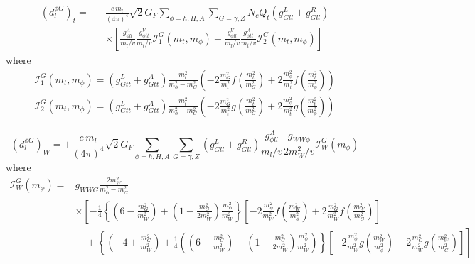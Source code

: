 \begin{align}\label{eq:BarrZee-phiG-toploop}
	(d^{\phi G}_{l})_{t} = -&\frac{e\,m_{l}}{(4\pi)^{4}}\sqrt{2}G_{F}\sum_{\phi=h,H,A}\sum_{G=\gamma,Z}N_{c}Q_{t}(g_{Gll}^{L}+g_{Gll}^{R}) \nonumber \\
	& \times \left[\frac{g_{\phi ll}^{A}}{m_{l}/v}\frac{g_{\phi tt}^{V}}{m_{t}/v}\mathcal{I}_{1}^{G}(m_{t}, m_{\phi}) + \frac{g_{\phi ll}^{V}}{m_{l}/v}\frac{g_{\phi tt}^{A}}{m_{t}/v}\mathcal{I}_{2}^{G}(m_{t}, m_{\phi})\right]
\end{align}
where
\begin{align}
	\mathcal{I}_{1}^{G}(m_{t},m_{\phi}) = (g_{Gtt}^{L}+g_{Gtt}^{A})\frac{m_{t}^{2}}{m_{\phi}^{2}-m_{G}^{2}}
	\left(-2\frac{m_{G}^{2}}{m_{t}^{2}} f\left(\frac{m_{t}^{2}}{m_{G}^{2}}\right) + 2\frac{m_{\phi}^{2}}{m_{t}^{2}} f\left(\frac{m_{t}^{2}}{m_{\phi}^{2}}\right)\right) \nonumber \\
	\mathcal{I}_{2}^{G}(m_{t},m_{\phi}) = (g_{Gtt}^{L}+g_{Gtt}^{A})\frac{m_{t}^{2}}{m_{\phi}^{2}-m_{G}^{2}}
	\left(-2\frac{m_{G}^{2}}{m_{t}^{2}} g\left(\frac{m_{t}^{2}}{m_{G}^{2}}\right) + 2\frac{m_{\phi}^{2}}{m_{t}^{2}} g\left(\frac{m_{t}^{2}}{m_{\phi}^{2}}\right)\right)
\end{align}

\begin{equation}\label{eq:BarrZee-phiG-Wloop}
	(d^{\phi G}_{l})_{W} = +\frac{e\,m_{l}}{(4\pi)^{4}}\sqrt{2}G_{F}\sum_{\phi=h,H,A}\sum_{G=\gamma,Z}(g_{Gll}^{L}+g_{Gll}^{R})\frac{g_{\phi ll}^{A}}{m_{l}/v}\frac{g_{WW\phi}}{2m_{W}^{2}/v}\mathcal{I}_{W}^{G}(m_{\phi})
\end{equation}
where
\begin{align}
	\mathcal{I}_{W}^{G}(m_{\phi}) = &g_{WWG}\frac{2m_{W}^{2}}{m_{\phi}^{2}-m_{G}^{2}} \nonumber \\
	& \times \left[-\frac{1}{4}\left\{\left(6-\frac{m_{G}^{2}}{m_{W}^{2}}\right) + \left(1-\frac{m_{G}^{2}}{2m_{W}^{2}}\right)\frac{m_{\phi}^{2}}{m_{W}^{2}}\right\}
	\left[-2\frac{m_{\phi}^{2}}{m_{W}^{2}} f\left(\frac{m_{W}^{2}}{m_{\phi}^{2}}\right) + 2\frac{m_{G}^{2}}{m_{W}^{2}} f\left(\frac{m_{W}^{2}}{m_{G}^{2}}\right)\right]\right. \nonumber \\
	&\left. \quad + \left\{\left(-4+\frac{m_{G}^{2}}{m_{W}^{2}}\right) + \frac{1}{4}\left(\left(6-\frac{m_{G}^{2}}{m_{W}^{2}}\right) + \left(1-\frac{m_{G}^{2}}{2m_{W}^{2}}\right)\frac{m_{\phi}^{2}}{m_{W}^{2}}\right)\right\}
	\left[-2\frac{m_{\phi}^{2}}{m_{W}^{2}} g\left(\frac{m_{W}^{2}}{m_{\phi}^{2}}\right) + 2\frac{m_{G}^{2}}{m_{W}^{2}} g\left(\frac{m_{W}^{2}}{m_{G}^{2}}\right)\right]\right]
\end{align}

